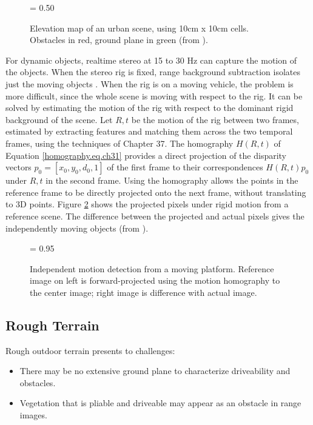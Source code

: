 \documentclass[twocolumn,oneside]{book}
\begin{document}
\begin{figure}[hbt]
{\epsfxsize = 0.50\textwidth {}}
\caption{Elevation map of an urban scene, using 10cm x 10cm cells.
Obstacles in red, ground plane in green (from \cite{triebel06}).
\label{elev_map.ch31}}
\end{figure}

For dynamic objects, realtime stereo at 15 to 30 Hz can capture the
motion of the objects.  When the stereo rig is fixed, range background
subtraction isolates just the moving objects \cite{eveland98}.  When
the rig is on a moving vehicle, the problem is more difficult, since
the whole scene is moving with respect to the rig.  It can be solved
by estimating the motion of the rig with respect to the dominant rigid
background of the scene.  Let $R,t$ be the motion of the rig between
two frames, estimated by extracting features and matching them across
the two temporal frames, using the techniques of Chapter 37.
The homography $H(R,t)$ of Equation
\ref{homography.eq.ch31} provides a direct projection of the disparity
vectors $p_0 = [x_0,y_0,d_0,1]$ of the first frame to their
correspondences $H(R,t)p_0$ under $R,t$ in the second frame.  Using
the homography allows the points in the reference frame to be directly
projected onto the next frame, without translating to 3D points.
Figure \ref{ind_motion.ch31} shows the projected pixels under rigid
motion from a reference scene.  The difference between the projected
and actual pixels gives the independently moving objects (from
\cite{agrawal05}).

\begin{figure}[ht!]
{\epsfxsize = 0.95\textwidth {}}
\caption{Independent motion detection from a moving platform.
Reference image on left is forward-projected using the motion homography to
the center image; right image is difference with actual image.
\label{ind_motion.ch31}}
\end{figure}


\subsection{Rough Terrain} \label{ch31.roughterrain}

Rough outdoor terrain presents to challenges:
\begin{itemize}
\item There may be no extensive ground plane to characterize
driveability and obstacles.
\item Vegetation that is pliable and driveable may appear as an
obstacle in range images.
\end{itemize}
\end{document}
